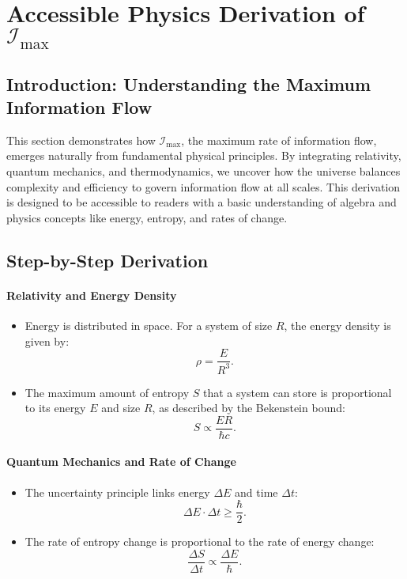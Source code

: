 \documentclass[12pt]{article}
\begin{document}
\section{Accessible Physics Derivation of \(\mathcal{I}_{\text{max}}\)}

\subsection{Introduction: Understanding the Maximum Information Flow}
This section demonstrates how \(\mathcal{I}_{\text{max}}\), the maximum rate of information flow, emerges naturally from fundamental physical principles. By integrating relativity, quantum mechanics, and thermodynamics, we uncover how the universe balances complexity and efficiency to govern information flow at all scales. This derivation is designed to be accessible to readers with a basic understanding of algebra and physics concepts like energy, entropy, and rates of change.

\subsection{Step-by-Step Derivation}

\paragraph{Relativity and Energy Density}
\begin{itemize}
    \item Energy is distributed in space. For a system of size \(R\), the energy density is given by:
    \[
    \rho = \frac{E}{R^3}.
    \]
    \item The maximum amount of entropy \(S\) that a system can store is proportional to its energy \(E\) and size \(R\), as described by the Bekenstein bound:
    \[
    S \propto \frac{E R}{\hbar c}.
    \]
\end{itemize}

\paragraph{Quantum Mechanics and Rate of Change}
\begin{itemize}
    \item The uncertainty principle links energy \(\Delta E\) and time \(\Delta t\):
    \[
    \Delta E \cdot \Delta t \geq \frac{\hbar}{2}.
    \]
    \item The rate of entropy change is proportional to the rate of energy change:
    \[
    \frac{\Delta S}{\Delta t} \propto \frac{\Delta E}{\hbar}.
    \]
\end{itemize}
\end{document}
